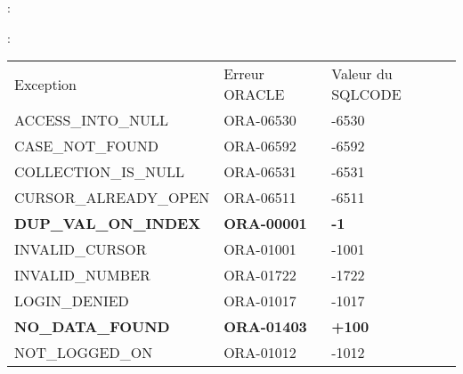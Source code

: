 \documentclass[10pt]{beamer}
\begin{document}
\begin{frame}{\secname : \subsecname}
    
\end{frame}
\begin{frame}{\secname : \subsecname}
    \begin{table}[]
        \begin{tabular}{lll}
            Exception                    & Erreur ORACLE      & Valeur du SQLCODE \\
            ACCESS\_INTO\_NULL           & ORA-06530          & -6530             \\
            CASE\_NOT\_FOUND             & ORA-06592          & -6592             \\
            COLLECTION\_IS\_NULL         & ORA-06531          & -6531             \\
            CURSOR\_ALREADY\_OPEN        & ORA-06511          & -6511             \\
            \textbf{DUP\_VAL\_ON\_INDEX} & \textbf{ORA-00001} & \textbf{-1}       \\
            INVALID\_CURSOR              & ORA-01001          & -1001             \\
            INVALID\_NUMBER              & ORA-01722          & -1722             \\
            LOGIN\_DENIED                & ORA-01017          & -1017             \\
            \textbf{NO\_DATA\_FOUND}     & \textbf{ORA-01403} & \textbf{+100}     \\
            NOT\_LOGGED\_ON              & ORA-01012          & -1012
        \end{tabular}
    \end{table}
\end{frame}
\end{document}
